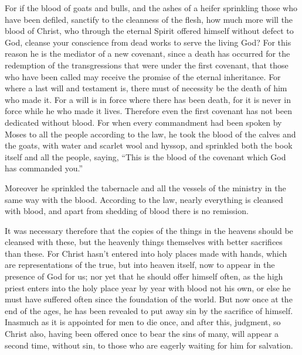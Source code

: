 {For if the blood of goats and bulls, and the ashes of a heifer sprinkling those who have been defiled, sanctify to the cleanness of the flesh,
how much more will the blood of Christ, who through the eternal Spirit offered himself without defect to God, cleanse your conscience from dead works to serve the living God?
For this reason he is the mediator of a new covenant, since a death has occurred for the redemption of the transgressions that were under the first covenant, that those who have been called may receive the promise of the eternal inheritance.
For where a last will and testament is, there must of necessity be the death of him who made it.
For a will is in force where there has been death, for it is never in force while he who made it lives.
Therefore even the first covenant has not been dedicated without blood.
For when every commandment had been spoken by Moses to all the people according to the law, he took the blood of the calves and the goats, with water and scarlet wool and hyssop, and sprinkled both the book itself and all the people,
saying, “This is the blood of the covenant which God has commanded you.”
\par }{\PP {}Moreover he sprinkled the tabernacle and all the vessels of the ministry in the same way with the blood.
According to the law, nearly everything is cleansed with blood, and apart from shedding of blood there is no remission.
\par }{\PP {}It was necessary therefore that the copies of the things in the heavens should be cleansed with these, but the heavenly things themselves with better sacrifices than these.
For Christ hasn’t entered into holy places made with hands, which are representations of the true, but into heaven itself, now to appear in the presence of God for us;
nor yet that he should offer himself often, as the high priest enters into the holy place year by year with blood not his own,
or else he must have suffered often since the foundation of the world. But now once at the end of the ages, he has been revealed to put away sin by the sacrifice of himself.
Inasmuch as it is appointed for men to die once, and after this, judgment,
so Christ also, having been offered once to bear the sins of many, will appear a second time, without sin, to those who are eagerly waiting for him for salvation.

}
